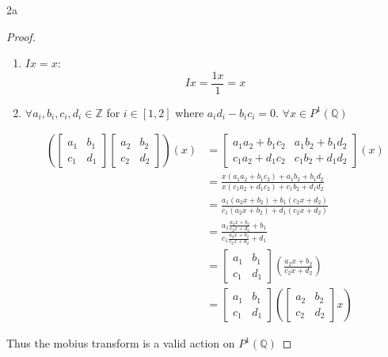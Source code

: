 \documentclass{article}
\newcommand{\Q}{\mathbb{Q}}
\newcommand{\Z}{\mathbb{Z}}
\begin{document}
\bigskip

\begin{PROB}{2a}\label{Problem 2a.}
\end{PROB}
\begin{proof}
    \begin{enumerate}
        \item $Ix = x$:  \[I x = \frac{1x}{1} = x\]
        \item $\forall a_{i}, b_{i}, c_{i}, d_{i} \in \Z$ for $i \in [1, 2]$ where $a_id_i - b_ic_i = 0$. $\forall x \in P^1(\Q)$ 
        
        \begin{align*}
            \left(\begin{bmatrix}
                a_1 & b_1 \\ c_1 & d_1
            \end{bmatrix} \begin{bmatrix}
                a_2 & b_2 \\ c_2 & d_2
            \end{bmatrix}\right) (x) &= \begin{bmatrix}
                a_1a_2 + b_1c_2 & a_1b_2 + b_1 d_2 \\
                c_1a_2 + d_1c_2 & c_1b_2 + d_1d_2
            \end{bmatrix} (x) \\
            &= \frac{x(a_1a_2 + b_1c_2) + a_1b_2 + b_1d_2}{x(c_1a_2+d_1c_2) + c_1b_2+d_1d_2} \\
            &= \frac{a_1(a_2x + b_2) + b_1(c_2x + d_2)}{c_1(a_2x + b_2) + d_1(c_2x + d_2)} \\
            &= \frac{a_1\frac{a_2x + b_2}{c_2x + d_2} + b_1}{c_1\frac{a_2x + b_2}{c_2x + d_2} + d_1} \\
            &= \begin{bmatrix}
                a_1 & b_1 \\ c_1 & d_1
            \end{bmatrix}\left(\frac{a_2x + b_2}{c_2x + d_2}\right) \\
            &= \begin{bmatrix}
                a_1 & b_1 \\ c_1 & d_1
            \end{bmatrix}\left( \begin{bmatrix}
                a_2 & b_2 \\ c_2 & d_2
            \end{bmatrix} x\right)
        \end{align*}
    \end{enumerate}
    
    Thus the mobius transform is a valid action on $P^1(\Q)$ 
\end{proof}
\end{document}
